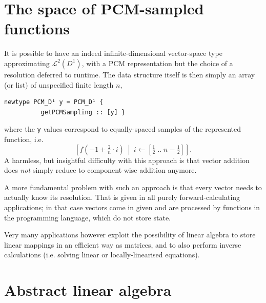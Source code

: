 \documentclass[sigplan,review,anonymous]{acmart}\settopmatter{printfolios=true,printccs=false,printacmref=false}
\begin{document}
\section{The space of PCM-sampled functions}
It is possible to have an indeed infinite-dimensional vector-space type approximating $\mathcal{L}^2(D^1)$, with a PCM representation but the choice of a resolution deferred to runtime. The data structure itself is then simply an array (or list) of unspecified finite length $n$,
\begin{lstlisting}
newtype PCM_D¹ y = PCM_D¹ {
          getPCMSampling :: [y] }
\end{lstlisting}
where the \lstinline`y` values correspond to equally-spaced samples of the represented function, i.e.
\[
  \left[f(-1 + \tfrac2n\cdot i)\ \middle|\ i\leftarrow[\tfrac12\;..\;n-\tfrac12]\right].
\]
A harmless, but insightful difficulty with this approach is that vector addition does \emph{not} simply reduce to component-wise addition anymore.

A more fundamental problem with such an approach is that every vector needs to actually know its resolution. That is given in all purely forward-calculating applications; in that case vectors come in given and are processed by functions in the programming language, which do not store state.

Very many applications however exploit the possibility of linear algebra to store linear mappings in an efficient way as matrices, and to also perform inverse calculations (i.e. solving linear or locally-linearised equations).

\section{Abstract linear algebra}
\end{document}
